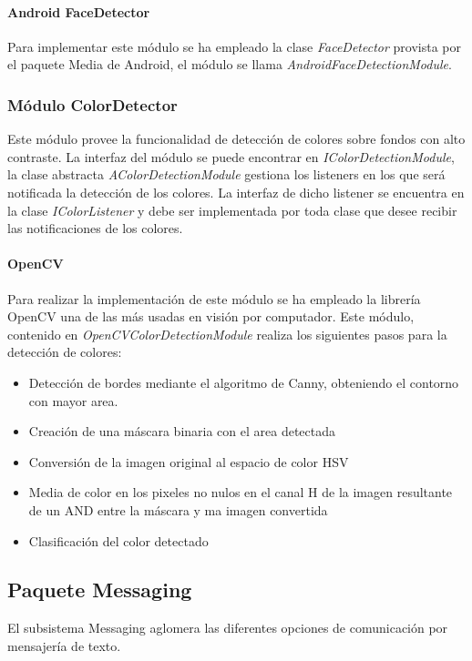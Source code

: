 \paragraph*{Android FaceDetector\\}
Para implementar este módulo se ha empleado la clase \textit{FaceDetector} provista por el paquete Media de Android, el módulo se llama \textit{AndroidFaceDetectionModule}.
\newpage

\subsubsection{Módulo ColorDetector}

Este módulo provee la funcionalidad de detección de colores sobre fondos con alto contraste. La interfaz del módulo se puede encontrar en \textit{IColorDetectionModule}, la clase abstracta \textit{AColorDetectionModule} gestiona los listeners en los que será notificada la detección de los colores. La interfaz de dicho listener se encuentra en la clase \textit{IColorListener} y debe ser implementada por toda clase que desee recibir las notificaciones de los colores.

\paragraph{OpenCV}

Para realizar la implementación de este módulo se ha empleado la librería OpenCV\cite{opencv} una de las más usadas en visión por computador. Este módulo, contenido en \textit{OpenCVColorDetectionModule} realiza los siguientes pasos para la detección de colores:
\begin{itemize}
	\item Detección de bordes mediante el algoritmo de Canny, obteniendo el contorno con mayor area.
	\item Creación de una máscara binaria con el area detectada
	\item Conversión de la imagen original al espacio de color HSV
	\item Media de color en los pixeles no nulos en el canal H de la imagen resultante de un AND entre la máscara y ma imagen convertida
	\item Clasificación del color detectado
\end{itemize}

\subsection{Paquete Messaging}
El subsistema Messaging aglomera las diferentes opciones de comunicación por mensajería de texto.
